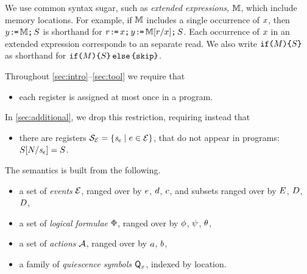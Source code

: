 We use common syntax sugar, such as \emph{extended expressions}, $\mathbb{M}$,
which include memory locations.  For example, if $\mathbb{M}$ includes a single
occurrence of $x$, then $y\mkern1mu\texttt{:}\mkern-1mu\texttt{=}\,\mathbb{M}\texttt{;}\,\allowbreak S$ is shorthand for
$r\mkern1mu\texttt{:}\mkern-1mu\texttt{=}\,x\texttt{;}\,\allowbreak y\mkern1mu\texttt{:}\mkern-1mu\texttt{=}\,\mathbb{M}[r/x]\texttt{;}\,\allowbreak S$.  Each
occurrence of $x$ in an extended expression corresponds to an separate
read.  We also write $\texttt{if}\,\allowbreak\!\texttt{(}M\texttt{)} \allowbreak\texttt{\{} S \texttt{\}}$ as shorthand for
$\texttt{if}\,\allowbreak\!\texttt{(}M\texttt{)} \allowbreak\texttt{\{} S\texttt{\}}\,\allowbreak\texttt{else}\,\allowbreak\texttt{\{} \texttt{skip}\texttt{\}}$.



Throughout \textsection\ref{sec:intro}--\ref{sec:tool} we 
require that
\begin{itemize}
\item each register is assigned at most once in a program.
\end{itemize}
In \textsection\ref{sec:additional}, we drop this restriction, requiring
instead that
\begin{itemize}
\item there are registers
  $\mathcal{S}_{\mathcal{E}}=\{\mathit{s}_{e}\mid e\in\mathcal{E}\}$, that do not
  appear in programs: $S[N/\mathit{s}_{e}]=S$.
\end{itemize}

The semantics is built from the following.
\begin{itemize}
\item a set of \emph{events} $\mathcal{E}$, ranged over by $e$, $d$,
  $c$, %
  and subsets ranged over by $E$, $D$, $D$,  
\item a set of \emph{logical formulae} $\Phi$, ranged over by $\phi$,
  $\psi$, $\theta$,
\item a set of \emph{actions} $\mathcal{A}$, ranged over by $a$, $b$,
\item a family of \emph{quiescence symbols} $\mathsf{Q}_{x}$, indexed by location.
\end{itemize}

